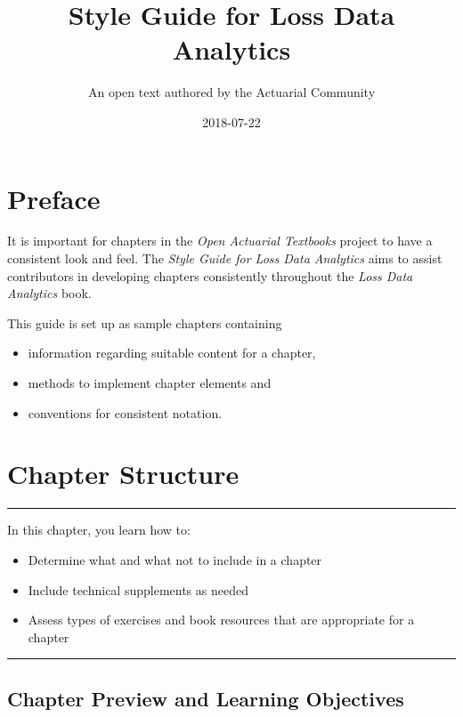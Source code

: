 \documentclass[]{book}
\title{Style Guide for Loss Data Analytics}
\author{An open text authored by the Actuarial Community}
\date{2018-07-22}
\providecommand{\tightlist}{%
  \setlength{\itemsep}{0pt}\setlength{\parskip}{0pt}}
\theoremstyle{definition}
\theoremstyle{definition}
\theoremstyle{definition}
\theoremstyle{remark}
\begin{document}
\maketitle

{
\setcounter{tocdepth}{1}
\tableofcontents
}
\chapter*{Preface}\label{preface}

It is important for chapters in the \emph{Open Actuarial Textbooks}
project to have a consistent look and feel. The \emph{Style Guide for
Loss Data Analytics} aims to assist contributors in developing chapters
consistently throughout the \emph{Loss Data Analytics} book.

This guide is set up as sample chapters containing

\begin{itemize}
\tightlist
\item
  information regarding suitable content for a chapter,
\item
  methods to implement chapter elements and
\item
  conventions for consistent notation.
\end{itemize}

\chapter{Chapter Structure}\label{chapter-structure}

\begin{center}\rule{0.5\linewidth}{\linethickness}\end{center}

In this chapter, you learn how to:

\begin{itemize}
\tightlist
\item
  Determine what and what not to include in a chapter
\item
  Include technical supplements as needed
\item
  Assess types of exercises and book resources that are appropriate for
  a chapter
\end{itemize}

\begin{center}\rule{0.5\linewidth}{\linethickness}\end{center}

\section{Chapter Preview and Learning
Objectives}\label{chapter-preview-and-learning-objectives}
\end{document}
